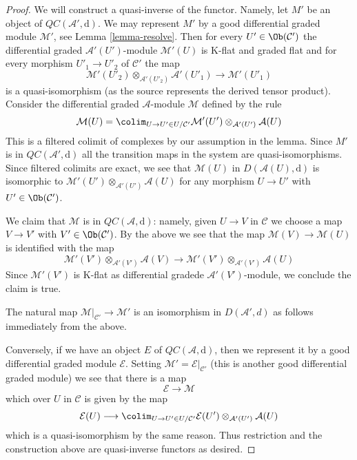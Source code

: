 \begin{proof}
We will construct a quasi-inverse of the functor. Namely,
let $M'$ be an object of $\mathit{QC}(\mathcal{A}', \text{d})$.
We may represent $M'$ by a good differential graded module $\mathcal{M}'$,
see Lemma \ref{lemma-resolve}. Then for every $U' \in \Ob(\mathcal{C}')$
the differential graded $\mathcal{A}'(U')$-module $\mathcal{M}'(U)$
is K-flat and graded flat and for every morphism $U'_1 \to U'_2$ of
$\mathcal{C}'$ the map
$$
\mathcal{M}'(U'_2) \otimes_{\mathcal{A}'(U'_2)} \mathcal{A}'(U'_1)
\longrightarrow
\mathcal{M}'(U'_1)
$$
is a quasi-isomorphism (as the source represents the derived tensor product).
Consider the differential graded
$\mathcal{A}$-module $\mathcal{M}$ defined by the rule
$$
\mathcal{M}(U) =
\colim_{U \to U' \in U/\mathcal{C}'}
\mathcal{M}'(U') \otimes_{\mathcal{A}'(U')} \mathcal{A}(U)
$$
This is a filtered colimit of complexes by our assumption in the lemma.
Since $M'$ is in $\mathit{QC}(\mathcal{A}', \text{d})$ all the
transition maps in the system are quasi-isomorphisms. Since filtered
colimits are exact, we see that
$\mathcal{M}(U)$ in $D(\mathcal{A}(U), \text{d})$
is isomorphic to $\mathcal{M}'(U') \otimes_{\mathcal{A}'(U')} \mathcal{A}(U)$
for any morphism $U \to U'$ with $U' \in \Ob(\mathcal{C}')$.

\medskip\noindent
We claim that $\mathcal{M}$ is in
$\mathit{QC}(\mathcal{A}, \text{d})$: namely, given $U \to V$ in
$\mathcal{C}$ we choose a map $V \to V'$ with $V' \in \Ob(\mathcal{C}')$.
By the above we see that the map $\mathcal{M}(V) \to \mathcal{M}(U)$
is identified with the map
$$
\mathcal{M}'(V') \otimes_{\mathcal{A}'(V')} \mathcal{A}(V)
\longrightarrow
\mathcal{M}'(V') \otimes_{\mathcal{A}'(V')} \mathcal{A}(U)
$$
Since $\mathcal{M'}(V')$ is K-flat as
differential gradede $\mathcal{A}'(V')$-module, we conclude
the claim is true.

\medskip\noindent
The natural map $\mathcal{M}|_{\mathcal{C}'} \to \mathcal{M}'$ is an
isomorphism in $D(\mathcal{A}', d)$ as follows immediately from the above.

\medskip\noindent
Conversely, if we have an object $E$ of $\mathit{QC}(\mathcal{A}, \text{d})$,
then we represent it by a good differential graded module $\mathcal{E}$.
Setting $\mathcal{M}' = \mathcal{E}|_{\mathcal{C}'}$ (this is another good
differential graded module) we see that there is a map
$$
\mathcal{E} \to \mathcal{M}
$$
which over $U$ in $\mathcal{C}$ is given by the map
$$
\mathcal{E}(U)
\longrightarrow
\colim_{U \to U' \in U/\mathcal{C}'}
\mathcal{E}(U') \otimes_{\mathcal{A}'(U')} \mathcal{A}(U)
$$
which is a quasi-isomorphism by the same reason. Thus restriction and
the construction above are quasi-inverse functors as desired.
\end{proof}

